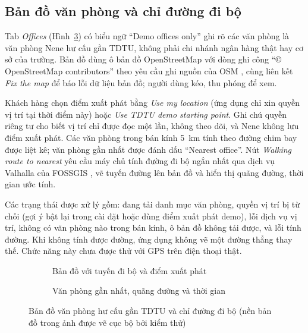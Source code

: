 \subsection{Bản đồ văn phòng và chỉ đường đi bộ}
\label{sec:ch4-offices}

Tab \textit{Offices} (Hình~\ref{fig:ch4-offices}) có biểu ngữ ``Demo offices only'' ghi rõ các văn phòng là văn phòng Nene hư cấu gần TDTU, không phải chi nhánh ngân hàng thật hay cơ sở của trường. Bản đồ dùng ô bản đồ OpenStreetMap với dòng ghi công ``\copyright{} OpenStreetMap contributors'' theo yêu cầu ghi nguồn của OSM \parencite{ch4-osm-copyright}, cùng liên kết \textit{Fix the map} để báo lỗi dữ liệu bản đồ; người dùng kéo, thu phóng để xem.

Khách hàng chọn điểm xuất phát bằng \textit{Use my location} (ứng dụng chỉ xin quyền vị trí tại thời điểm này) hoặc \textit{Use TDTU demo starting point}. Ghi chú quyền riêng tư cho biết vị trí chỉ được đọc một lần, không theo dõi, và Nene không lưu điểm xuất phát. Các văn phòng trong bán kính 5~km tính theo đường chim bay được liệt kê; văn phòng gần nhất được đánh dấu ``Nearest office''. Nút \textit{Walking route to nearest} yêu cầu máy chủ tính đường đi bộ ngắn nhất qua dịch vụ Valhalla của FOSSGIS \parencite{ch2-valhalla}, vẽ tuyến đường lên bản đồ và hiển thị quãng đường, thời gian ước tính.

Các trạng thái được xử lý gồm: đang tải danh mục văn phòng, quyền vị trí bị từ chối (gợi ý bật lại trong cài đặt hoặc dùng điểm xuất phát demo), lỗi dịch vụ vị trí, không có văn phòng nào trong bán kính, ô bản đồ không tải được, và lỗi tính đường. Khi không tính được đường, ứng dụng không vẽ một đường thẳng thay thế. Chức năng này chưa được thử với GPS trên điện thoại thật.

\begin{figure}[H]
\centering
\begin{subfigure}[t]{0.4\textwidth}
  \centering
  \caption{Bản đồ với tuyến đi bộ và điểm xuất phát}
  \label{fig:ch4-offices-map}
\end{subfigure}\hspace{0.05\textwidth}%
\begin{subfigure}[t]{0.4\textwidth}
  \centering
  \caption{Văn phòng gần nhất, quãng đường và thời gian}
  \label{fig:ch4-offices-route}
\end{subfigure}
\caption{Bản đồ văn phòng hư cấu gần TDTU và chỉ đường đi bộ (nền bản đồ trong ảnh được vẽ cục bộ bởi kiểm thử)}
\label{fig:ch4-offices}
\end{figure}


